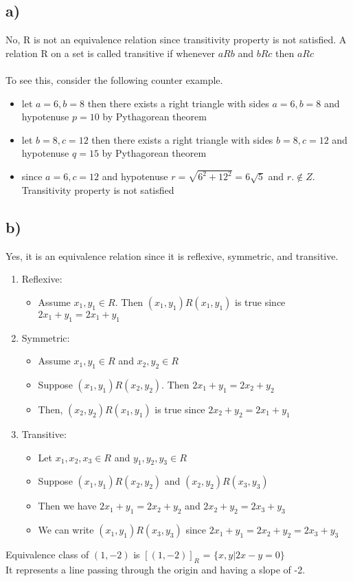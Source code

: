 \documentclass[12pt]{article}
\begin{document}
\subsection*{a) }
No, R is not an equivalence relation since transitivity property is not satisfied. A relation R on a set is called transitive if whenever $aRb$ and $bRc$ then $aRc$\\ \\
To see this, consider the following counter example. 
\begin{itemize}
    \item let $a=6, b=8$ then there exists a right triangle with sides $a=6, b=8 $ and hypotenuse $p=10$ by Pythagorean theorem
    \item let $b=8, c=12$ then there exists a right triangle with sides $b=8, c=12$ and hypotenuse $q=15$ by Pythagorean theorem
    \item since $a=6, c=12$ and hypotenuse $r=\sqrt{6^2+12^2} = 6\sqrt{5}$ and $r. \notin Z$. Transitivity property is not satisfied
\end{itemize}
\subsection*{b) }
Yes, it is an equivalence relation since it is reflexive, symmetric, and transitive.

\begin{enumerate}
    \item Reflexive:
    \begin{itemize}
        \item Assume $x_1, y_1 \in R$. Then $(x_1, y_1)R(x_1, y_1)$ is true since $2x_1 + y_1 = 2x_1 + y_1 $
    \end{itemize}
    \item Symmetric:
    \begin{itemize}
        \item Assume $x_1, y_1 \in R$ and $x_2, y_2 \in R$
        \item Suppose $(x_1, y_1)R(x_2, y_2)$. Then $2x_1 + y_1 = 2x_2 + y_2$
        \item Then, $(x_2, y_2)R(x_1, y_1)$ is true since $2x_2 + y_2= 2x_1 + y_1$
    \end{itemize}
    \item Transitive:
    \begin{itemize}
        \item Let $x_1, x_2, x_3 \in R$ and $y_1,y_2,y_3 \in R$
        \item Suppose $(x_1, y_1)R(x_2, y_2)$ and $(x_2, y_2)R(x_3, y_3)$
        \item Then we have $2x_1 + y_1 = 2x_2 +y_2$ and $2x_2 + y_2 = 2x_3 +y_3$
        \item We can write $(x_1, y_1)R(x_3, y_3)$ since $2x_1 + y_1 = 2x_2 + y_2 = 2x_3 +y_3$
    \end{itemize}
\end{enumerate}
Equivalence class of $(1,-2)$ is  $[(1,-2)]_{R}$ = $\{ x, y  | 2x-y =0\}$ \\
It represents a line passing through the origin and having a slope of -2.
\end{document}
